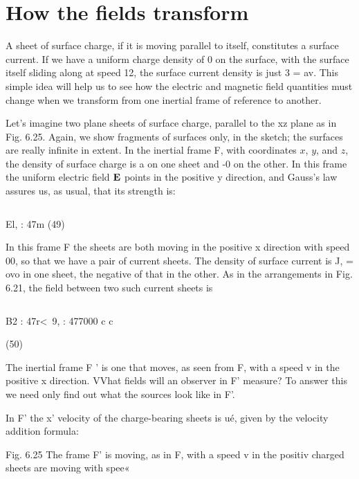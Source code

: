\section{How the fields transform}

A sheet of surface charge, if it is moving parallel to itself, constitutes
a surface current. If we have a uniform charge density of 0
on the surface, with the surface itself sliding along at speed 12, the
surface current density is just 3 = av. This simple idea will help us
to see how the electric and magnetic field quantities must change
when we transform from one inertial frame of reference to another.

Let's imagine two plane sheets of surface charge, parallel to the
xz plane as in Fig. 6.25. Again, we show fragments of surfaces only,
in the sketch; the surfaces are really infinite in extent. In the inertial
frame F, with coordinates $x$, $y$, and $z$, the density of surface charge
is a on one sheet and -0 on the other. In this frame the uniform
electric field $\mathbf{E}$ points in the positive y direction, and Gauss's law
assures us, as usual, that its strength is:

\begin{equation}
\end{equation}

El, : 47m (49)

In this frame F the sheets are both moving in the positive x direction
with speed 00, so that we have a pair of current sheets. The
density of surface current is J, = ovo in one sheet, the negative of
that in the other. As in the arrangements in Fig. 6.21, the field between
two such current sheets is

\begin{equation}
\end{equation}

B2 : 47r<~9, : 477000
c c

(50)

The inertial frame F ' is one that moves, as seen from F, with a speed
v in the positive x direction. VVhat fields will an observer in F'
measure? To answer this we need only find out what the sources look
like in F'.

In F' the x' velocity of the charge-bearing sheets is ué, given by
the velocity addition formula:

 

Fig. 6.25 The frame F' is moving, as
in F, with a speed v in the positiv
charged sheets are moving with spee«


